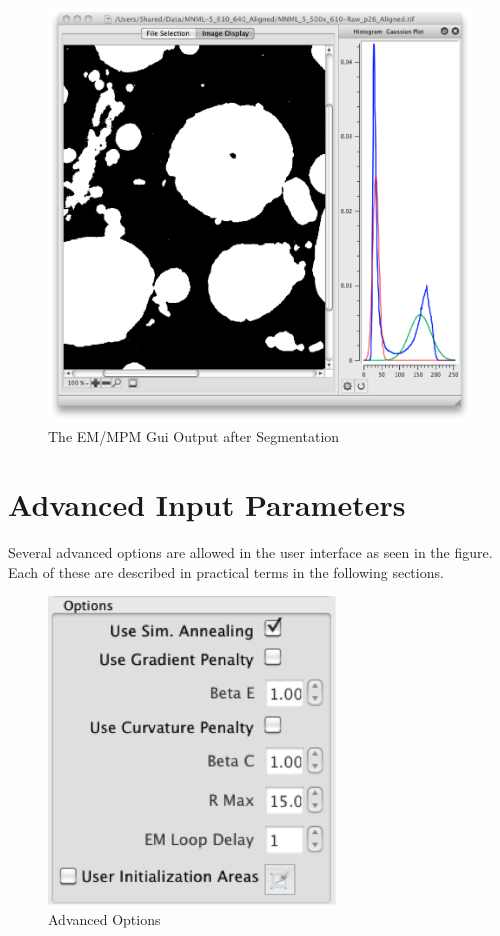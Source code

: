 \documentclass[12pt,oneside]{book}
\begin{document}
 
\begin{figure}[htbp]
\begin{center}
\includegraphics[width=6.0in]{images/Untitled6.png}
\caption{The EM/MPM Gui Output after Segmentation}
\label{image6}
\end{center}
\end{figure}

\section{Advanced Input Parameters}
Several advanced options are allowed in the user interface as seen in the figure. Each of these are described in practical terms in the following sections.
 

\begin{figure}[htbp]
\begin{center}
\includegraphics[width=3.0in]{images/Untitled7.png}
\caption{Advanced Options}
\label{image7}
\end{center}
\end{figure}
\end{document}
